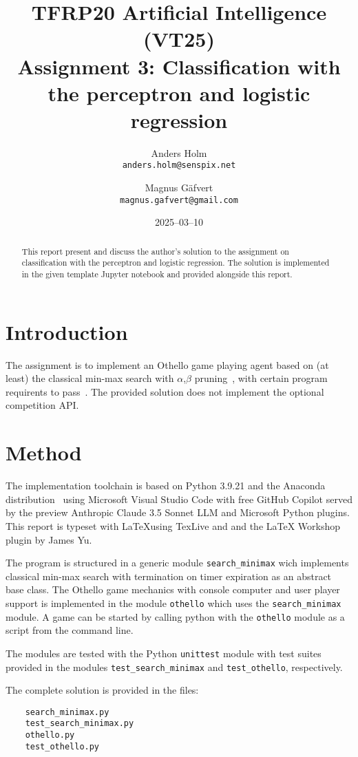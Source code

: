 \documentclass[a4paper]{article}
\title{TFRP20 Artificial Intelligence (VT25)\\ Assignment 3: Classification with the perceptron and logistic regression}
\author{Anders Holm\\\texttt{anders.holm@senspix.net} \and
Magnus Gäfvert\\\texttt{magnus.gafvert@gmail.com}}
\date{2025--03--10}
\begin{document}
\maketitle
\begin{abstract}
    This report present and discuss the author's solution to the assignment on classification with the perceptron and logistic regression. The solution is implemented in the given template Jupyter notebook and provided alongside this report.
\end{abstract}

\section{Introduction}
The assignment is to implement an Othello game playing agent based on (at least) the classical min-max search with $\alpha$,$\beta$ pruning~\cite{aima}, with certain program requirents to pass~\cite{tfrp20assignment1}. The provided solution does not implement the optional competition API. 

\section{Method}
The implementation toolchain is based on Python 3.9.21 and the Anaconda distribution~\cite{anaconda} using Microsoft Visual Studio Code with free GitHub Copilot served by the preview Anthropic Claude 3.5 Sonnet LLM and Microsoft Python plugins. This report is typeset with \LaTeX using TexLive and and the LaTeX Workshop plugin by James Yu.

The program is structured in a generic module \texttt{search\_minimax} wich implements classical min-max search with termination on timer expiration as an abstract base class. The Othello game mechanics with console computer and user player support is implemented in the module \texttt{othello} which uses the \texttt{search\_minimax} module. A game can be started by calling python with the \texttt{othello} module as a script from the command line.

The modules are tested with the Python \texttt{unittest} module with test suites provided in the modules \texttt{test\_search\_minimax} and \texttt{test\_othello}, respectively.

The complete solution is provided in the files:
\begin{verbatim}
    search_minimax.py
    test_search_minimax.py
    othello.py
    test_othello.py
\end{verbatim}
\end{document}
